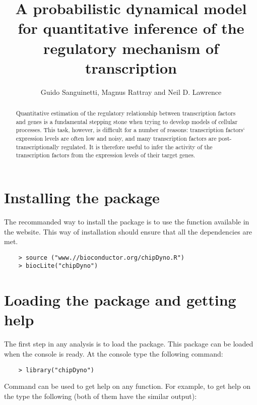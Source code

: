 \documentclass{article}
\title{A probabilistic dynamical model for quantitative inference of the regulatory mechanism of transcription}
\author{Guido Sanguinetti, Magnus Rattray and Neil D. Lawrence}
\begin{document}


\maketitle

\begin{abstract}
Quantitative estimation of the regulatory relationship between transcription factors and genes is a fundamental stepping stone when trying to develop models of cellular processes. This task, however, is difficult for a number of reasons: transcription factors` expression levels are often low and noisy, and many transcription factors are post-transcriptionally regulated. It is therefore useful to infer the activity of the transcription factors from the expression levels of their target genes.
\end{abstract}

\tableofcontents

\section{Installing the  package}
The recommanded way to install the \Bioconductor{} package  is to use the  function available in the \Bioconductor{} website. This way of installation should ensure that all the dependencies are met.

\begin{verbatim}
    > source ("www.//bioconductor.org/chipDyno.R")
    > biocLite("chipDyno")
\end{verbatim}


\section{Loading the package and getting help}
The first step in any  analysis is to load the package. This package can be loaded when the \R{} console is ready. At the \R{} console type the following command:

\begin{verbatim}
    > library("chipDyno")
\end{verbatim}

Command  can be used to get help on any function. For example, to get help on the  type the following (both of them have the similar output):
\end{document}
